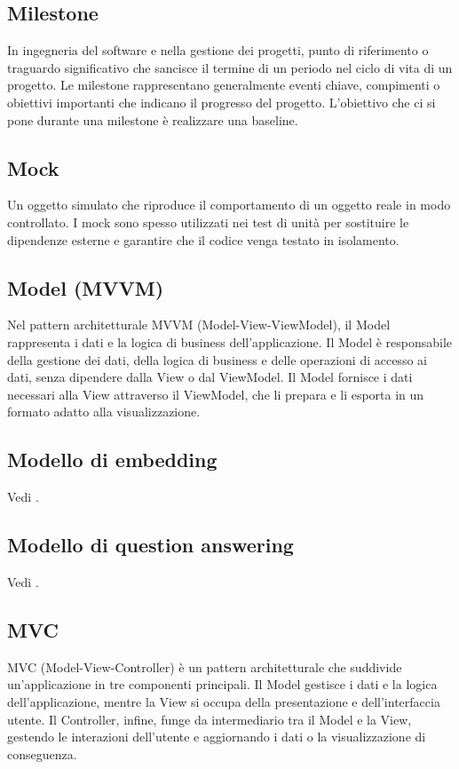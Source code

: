 \subsection*{Milestone}
In ingegneria del software e nella gestione dei progetti, punto di riferimento o traguardo significativo che sancisce il termine di un periodo nel ciclo 
di vita di un progetto. Le milestone rappresentano generalmente eventi chiave, compimenti o obiettivi importanti che indicano il progresso del progetto. 
L’obiettivo che ci si pone durante una milestone è realizzare una baseline.

\hypertarget{sec:mock}{}
\subsection*{Mock}
Un oggetto simulato che riproduce il comportamento di un oggetto reale in modo controllato. I mock sono spesso utilizzati nei test di unità per sostituire
le dipendenze esterne e garantire che il codice venga testato in isolamento.

\hypertarget{sec:model_mvvm}{}
\subsection*{Model (MVVM)}
Nel pattern architetturale MVVM (Model-View-ViewModel), il Model rappresenta i dati e la logica di business dell'applicazione. Il Model è responsabile della
gestione dei dati, della logica di business e delle operazioni di accesso ai dati, senza dipendere dalla View o dal ViewModel. Il Model fornisce i dati
necessari alla View attraverso il ViewModel, che li prepara e li esporta in un formato adatto alla visualizzazione.

\hypertarget{sec:modello_di_embedding}{}
\subsection*{Modello di embedding}
Vedi .

\hypertarget{sec:modello_di_question_answering}{}
\subsection*{Modello di question answering}
Vedi .

\hypertarget{sec:MVC}{}
\subsection*{MVC}
MVC (Model-View-Controller) è un pattern architetturale che suddivide un'applicazione in tre componenti principali.
Il Model gestisce i dati e la logica dell'applicazione, mentre la View si occupa della presentazione e dell'interfaccia utente. 
Il Controller, infine, funge da intermediario tra il Model e la View, gestendo le interazioni dell'utente e aggiornando i dati o la visualizzazione di conseguenza.

